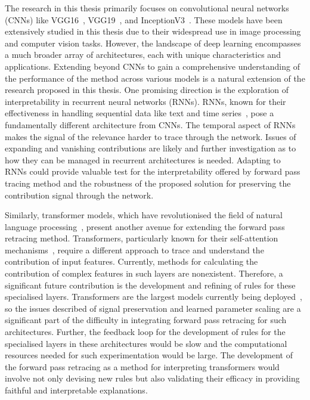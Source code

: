 The research in this thesis primarily focuses on convolutional neural networks (CNNs) like VGG16~\cite{SimonyanZ14a}, VGG19~\cite{SimonyanZ14a}, and InceptionV3~\cite{szegedy2015rethinking}. These models have been extensively studied in this thesis due to their widespread use in image processing and computer vision tasks. However, the landscape of deep learning encompasses a much broader array of architectures, each with unique characteristics and applications. Extending beyond CNNs to gain a comprehensive understanding of the performance of the method across various models is a natural extension of the research proposed in this thesis. One promising direction is the exploration of interpretability in recurrent neural networks (RNNs). RNNs, known for their effectiveness in handling sequential data like text and time series~\cite{10.1162/neco.1997.9.8.1735}, pose a fundamentally different architecture from CNNs. The temporal aspect of RNNs makes the signal of the relevance harder to trace through the network. Issues of expanding and vanishing contributions are likely and further investigation as to how they can be managed in recurrent architectures is needed. Adapting to RNNs could provide valuable test for the interpretability offered by forward pass tracing method and the robustness of the proposed solution for 
preserving the contribution signal through the network.


Similarly, transformer models, which have revolutionised the field of natural language processing~\cite{rothman2021transformers, chernyavskiy2021transformers, tunstall2022natural}, present another avenue for extending the forward pass retracing method. Transformers, particularly known for their self-attention mechanisms~\cite{VaswaniSPUJGKP17}, require a different approach to trace and understand the contribution of input features. Currently, methods for calculating the contribution of complex features in such layers are nonexistent. Therefore, a significant future contribution is the development and refining of rules for these specialised layers. Transformers are the largest models currently being deployed~\cite{VaswaniSPUJGKP17}, so the issues described of signal preservation and learned parameter scaling are a significant part of the difficulty in integrating forward pass retracing for such architectures. Further, the feedback loop for the development of rules for the specialised layers in these architectures would be slow and the computational resources needed for such experimentation would be large. The development of the forward pass retracing as a method for interpreting transformers would involve not only devising new rules but also validating their efficacy in providing faithful and interpretable explanations. 


